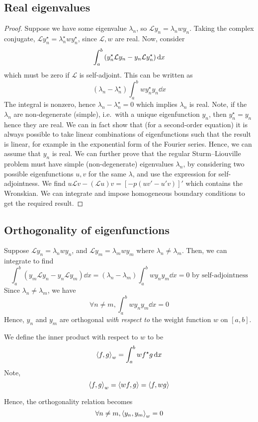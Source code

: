 \subsection{Real eigenvalues}
\begin{proof}
	Suppose we have some eigenvalue \( \lambda_n \), so \( \mathcal L y_n = \lambda_n w y_n \).
	Taking the complex conjugate, \( \mathcal L y_n^\star = \lambda_n^\star w y_n^\star \), since \( \mathcal L, w \) are real.
	Now, consider
	\[
		\int_a^b \qty(y_n^\star \mathcal L y_n - y_n \mathcal L y_n^\star) \dd{x}
	\]
	which must be zero if \( \mathcal L \) is self-adjoint.
	This can be written as
	\[
		(\lambda_n - \lambda_n^\star) \int_a^b w y_n^\star y_n \dd{x}
	\]
	The integral is nonzero, hence \( \lambda_n - \lambda_n^\star = 0 \) which implies \( \lambda_n \) is real.
	Note, if the \( \lambda_n \) are non-degenerate (simple), i.e.\ with a unique eigenfunction \( y_n \), then \( y_n^\star = y_n \) hence they are real.
	We can in fact show that (for a second-order equation) it is always possible to take linear combinations of eigenfunctions such that the result is linear, for example in the exponential form of the Fourier series.
	Hence, we can assume that \( y_n \) is real.
	We can further prove that the regular Sturm--Liouville problem must have simple (non-degenerate) eigenvalues \( \lambda_n \), by considering two possible eigenfunctions \( u, v \) for the same \( \lambda \), and use the expression for self-adjointness.
	We find \( u \mathcal L v - (\mathcal L u) v = [-p(uv' - u'v)]' \) which contains the Wronskian.
	We can integrate and impose homogeneous boundary conditions to get the required result.
\end{proof}

\subsection{Orthogonality of eigenfunctions}
Suppose \( \mathcal L y_n = \lambda_n w y_n \), and \( \mathcal L y_m = \lambda_m w y_m \) where \( \lambda_n \neq \lambda_m \).
Then, we can integrate to find
\[
	\int_a^b (y_m \mathcal L y_n - y_n \mathcal L y_m) \dd{x} = (\lambda_n - \lambda_m) \int_a^b w y_n y_m \dd{x} = 0 \text{ by self-adjointness}
\]
Since \( \lambda_n \neq \lambda_m \), we have
\[
	\forall n \neq m, \int_a^b w y_n y_m \dd{x} = 0
\]
Hence, \( y_n \) and \( y_m \) are orthogonal \textit{with respect to} the weight function \( w \) on \( [a,b] \).
\begin{definition}
	We define the inner product with respect to \( w \) to be
	\[
		\left\langle{f,g}\right\rangle_w = \int_a^b w f^\star g \dd{x}
	\]
	Note,
	\[
		\left\langle{f,g}\right\rangle_w = \left\langle{wf,g}\right\rangle = \left\langle{f,wg}\right\rangle
	\]
\end{definition}
Hence, the orthogonality relation becomes
\[
	\forall n \neq m, \left\langle{y_n, y_m}\right\rangle_w = 0
\]

